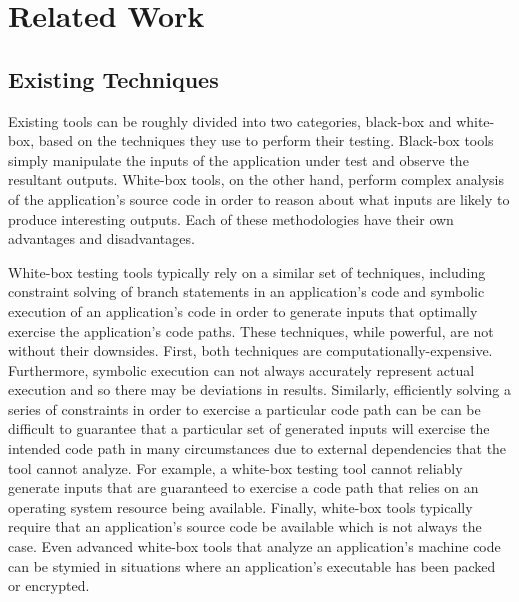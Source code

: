 \section{Related Work}

    \subsection{Existing Techniques}

    Existing tools can be roughly divided into two categories, black-box and white-box, based on the techniques they
    use to perform their testing. Black-box tools simply manipulate the inputs of the application under test and
    observe the resultant outputs. White-box tools, on the other hand, perform complex analysis of the application's
    source code in order to reason about what inputs are likely to produce interesting outputs. Each of these
    methodologies have their own advantages and disadvantages.

    White-box testing tools typically rely on a similar set of techniques, including constraint solving of branch
    statements in an application's code and symbolic execution of an application's code in order to generate inputs
    that optimally exercise the application's code paths. These techniques, while powerful, are not without their
    downsides. First, both techniques are computationally-expensive. Furthermore, symbolic execution can not always
    accurately represent actual execution and so there may be deviations in results. Similarly, efficiently solving
    a series of constraints in order to exercise a particular code path can be can be difficult to guarantee that a
    particular set of generated inputs will exercise the intended code path in many circumstances due to external
    dependencies that the tool cannot analyze. For example, a white-box testing tool cannot reliably generate inputs
    that are guaranteed to exercise a code path that relies on an operating system resource being available.
    Finally, white-box tools typically require that an application's source code be available which is not always
    the case. Even advanced white-box tools that analyze an application's machine code can be stymied in situations
    where an application's executable has been packed or encrypted.

